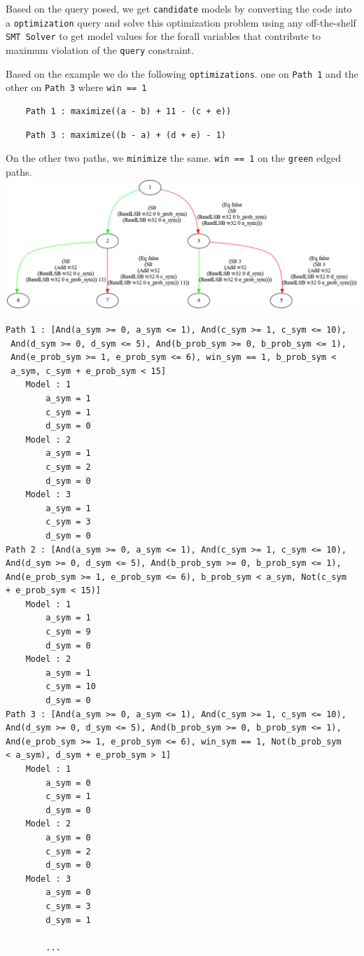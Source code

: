 \documentclass{article}
\begin{document}
Based on the query posed, we get \texttt{candidate} models by converting the code into a \texttt{optimization} query and solve this optimization problem using any off-the-shelf 
\texttt{SMT Solver} to get model values for the forall variables that contribute to maximum 
violation of the \texttt{query} constraint. 

Based on the example we do the following \texttt{optimizations}. one on \texttt{Path 1} and the other on \texttt{Path 3} where \texttt{win == 1} 

\begin{verbatim}
	Path 1 : maximize((a - b) + 11 - (c + e))
\end{verbatim}

\begin{verbatim}
	Path 3 : maximize((b - a) + (d + e) - 1)
\end{verbatim}

On the other two paths, we \texttt{minimize} the same. \texttt{win == 1} on the \texttt{green} edged paths. \\

\includegraphics[scale=0.35]{exectree1.png} 

\begin{verbatim}
Path 1 : [And(a_sym >= 0, a_sym <= 1), And(c_sym >= 1, c_sym <= 10),
 And(d_sym >= 0, d_sym <= 5), And(b_prob_sym >= 0, b_prob_sym <= 1), 
 And(e_prob_sym >= 1, e_prob_sym <= 6), win_sym == 1, b_prob_sym < 
 a_sym, c_sym + e_prob_sym < 15]
	Model : 1
		a_sym = 1
		c_sym = 1
		d_sym = 0
	Model : 2
		a_sym = 1
		c_sym = 2
		d_sym = 0
	Model : 3
		a_sym = 1
		c_sym = 3
		d_sym = 0
Path 2 : [And(a_sym >= 0, a_sym <= 1), And(c_sym >= 1, c_sym <= 10), 
And(d_sym >= 0, d_sym <= 5), And(b_prob_sym >= 0, b_prob_sym <= 1), 
And(e_prob_sym >= 1, e_prob_sym <= 6), b_prob_sym < a_sym, Not(c_sym 
+ e_prob_sym < 15)]
	Model : 1
		a_sym = 1
		c_sym = 9
		d_sym = 0
	Model : 2
		a_sym = 1
		c_sym = 10
		d_sym = 0
Path 3 : [And(a_sym >= 0, a_sym <= 1), And(c_sym >= 1, c_sym <= 10), 
And(d_sym >= 0, d_sym <= 5), And(b_prob_sym >= 0, b_prob_sym <= 1), 
And(e_prob_sym >= 1, e_prob_sym <= 6), win_sym == 1, Not(b_prob_sym 
< a_sym), d_sym + e_prob_sym > 1]
	Model : 1
		a_sym = 0
		c_sym = 1
		d_sym = 0
	Model : 2
		a_sym = 0
		c_sym = 2
		d_sym = 0
	Model : 3
		a_sym = 0
		c_sym = 3
		d_sym = 1

		...
\end{verbatim}
\end{document}

